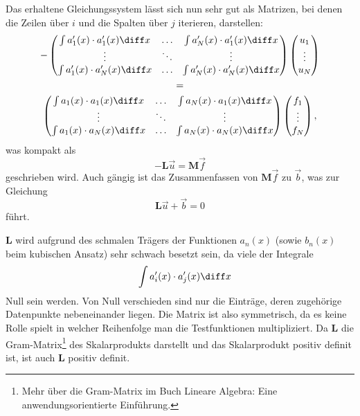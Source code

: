 Das erhaltene Gleichungssystem lässt sich nun sehr gut als Matrizen, bei denen die Zeilen über $i$ und die Spalten über $j$ iterieren, darstellen:
\begin{multline}
    -\left(
        \begin{matrix}
            \int a'_1(x) \cdot a'_1(x) \diff x & \hdots & \int a'_N(x) \cdot a'_1(x) \diff x \\
            \vdots                          & \ddots & \vdots                           \\
            \int a'_1(x) \cdot a'_N(x) \diff x & \hdots & \int a'_N(x) \cdot a'_N(x) \diff x \\
        \end{matrix}
    \right)
    \left(
        \begin{matrix}
            u_1 \\
            \vdots \\
            u_N
        \end{matrix}
    \right) \\
    = \\
    \left(
        \begin{matrix}
            \int a_1(x) \cdot a_1(x) \diff x & \hdots & \int a_N(x) \cdot a_1(x) \diff x \\
            \vdots                        & \ddots & \vdots                         \\
            \int a_1(x) \cdot a_N(x) \diff x & \hdots & \int a_N(x) \cdot a_N(x) \diff x \\
        \end{matrix}
    \right)
    \left(
        \begin{matrix}
            f_1 \\
            \vdots \\
            f_N
        \end{matrix}
    \right),
\end{multline}
was kompakt als
\begin{equation}
    -\mathbf{L}\vec{u} = \mathbf{M}\vec{f}
\end{equation}
geschrieben wird.
Auch gängig ist das Zusammenfassen von $\mathbf{M}\vec{f}$ zu $\vec{b}$, was zur Gleichung
\begin{equation}
    \mathbf{L}\vec{u} + \vec{b} = 0
\end{equation}
führt.

$\mathbf{L}$ wird aufgrund des schmalen Trägers der Funktionen $a_n(x)$ (sowie $b_n(x)$ beim kubischen Ansatz) sehr schwach besetzt sein, da viele der Integrale
\begin{equation}
    \quad \int a'_i(x) \cdot a'_j(x) \diff x 
\end{equation}
Null sein werden.
Von Null verschieden sind nur die Einträge, deren zugehörige Datenpunkte nebeneinander liegen.
Die Matrix ist also symmetrisch, da es keine Rolle spielt in welcher Reihenfolge man die Testfunktionen multipliziert.
Da $\mathbf{L}$ die Gram-Matrix\footnote{Mehr über die Gram-Matrix im Buch Lineare Algebra: Eine anwendungsorientierte Einführung\cite{buch:linalg}.} des Skalarprodukts darstellt und das Skalarprodukt positiv definit ist, ist auch $\mathbf{L}$ positiv definit.

